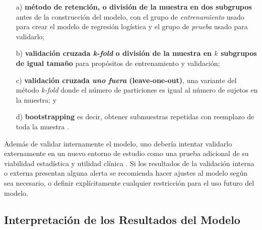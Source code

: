\documentclass[12pt]{article}
\begin{document}
\begin{itemize}
\item[a) ] \textbf{m\'etodo de retenci\'on, o divisi\'on de la muestra en dos subgrupos} antes de la construcci\'on del modelo, con el grupo de \textit{entrenamiento} usado para crear el modelo de regresi\'on log\'istica y el grupo de \textit{prueba} usado para validarlo; \cite{altman2000, kohavi1995} 

\item[b) ] \textbf{validaci\'on cruzada \textit{k-fold} o divisi\'on de la muestra en $k$ subgrupos de igual tama\~no} para prop\'ositos de entrenamiento y validaci\'on;\cite{kohavi1995} 

\item[c) ] \textbf{validaci\'on cruzada \textit{uno fuera} (leave-one-out)}, una variante del m\'etodo \textit{k-fold} donde el n\'umero de particiones es igual al n\'umero de sujetos en la muestra;\cite{kohavi1995} y 

\item[d) ] \textbf{bootstrapping} es decir, obtener submuestras repetidas con reemplazo de toda la muestra \cite{kohavi1995,efron1993}.
\end{itemize}

Adem\'as de validar internamente el modelo, uno deber\'ia intentar validarlo externamente en un nuevo entorno de estudio como una prueba adicional de su viabilidad estad\'istica y utilidad cl\'inica \cite{altman2000,miller1991}. Si los resultados de la validaci\'on interna o externa presentan alguna alerta se recomienda hacer ajustes al modelo seg\'un sea necesario, o definir expl\'icitamente cualquier restricci\'on para el uso futuro del modelo.\cite{miller1991}

\subsection{Interpretaci\'on de los Resultados del Modelo}
\end{document}
